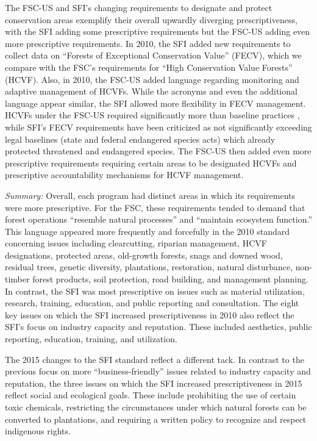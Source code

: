 \documentclass[
      12pt,
            Review ]{article}
\begin{document}
The FSC-US and SFI's changing requirements to designate and protect conservation areas exemplify their overall upwardly diverging prescriptiveness, with the SFI adding some prescriptive requirements but the FSC-US adding even more prescriptive requirements. In 2010, the SFI added new requirements to collect data on ``Forests of Exceptional Conservation Value'' (FECV), which we compare with the FSC's requirements for ``High Conservation Value Forests'' (HCVF). Also, in 2010, the FSC-US added language regarding monitoring and adaptive management of HCVFs. While the acronyms and even the additional language appear similar, the SFI allowed more flexibility in FECV management. HCVFs under the FSC-US required significantly more than baseline practices \citep{Newsom2005}, while SFI's FECV requirements have been criticized as not significantly exceeding legal baselines (state and federal endangered species acts) which already protected threatened and endangered species. The FSC-US then added even more prescriptive requirements requiring certain areas to be designated HCVFs and prescriptive accountability mechanisms for HCVF management.

\emph{Summary:} Overall, each program had distinct areas in which its requirements were more prescriptive. For the FSC, these requirements tended to demand that forest operations ``resemble natural processes'' and ``maintain ecosystem function.'' This language appeared more frequently and forcefully in the 2010 standard concerning issues including clearcutting, riparian management, HCVF designations, protected areas, old-growth forests, snags and downed wood, residual trees, genetic diversity, plantations, restoration, natural disturbance, non-timber forest products, soil protection, road building, and management planning. In contrast, the SFI was most prescriptive on issues such as material utilization, research, training, education, and public reporting and consultation. The eight key issues on which the SFI increased prescriptiveness in 2010 also reflect the SFI's focus on industry capacity and reputation. These included aesthetics, public reporting, education, training, and utilization.

The 2015 changes to the SFI standard reflect a different tack. In contrast to the previous focus on more ``business-friendly'' issues related to industry capacity and reputation, the three issues on which the SFI increased prescriptiveness in 2015 reflect social and ecological goals. These include prohibiting the use of certain toxic chemicals, restricting the circumstances under which natural forests can be converted to plantations, and requiring a written policy to recognize and respect indigenous rights.
\end{document}
